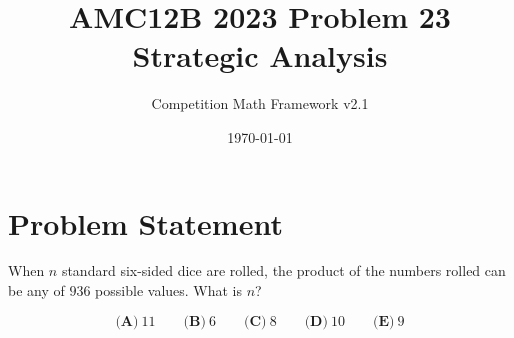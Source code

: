 \documentclass[12pt]{article}
\begin{document}
\title{AMC12B 2023 Problem 23\\Strategic Analysis}
\author{Competition Math Framework v2.1}
\date{\today}
\maketitle

\section*{Problem Statement}

When $n$ standard six-sided dice are rolled, the product of the numbers rolled can be any of $936$ possible values. What is $n$?

$$\textbf{(A)}~11\qquad\textbf{(B)}~6\qquad\textbf{(C)}~8\qquad\textbf{(D)}~10\qquad\textbf{(E)}~9$$
\end{document}
